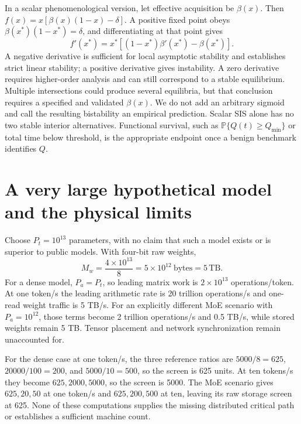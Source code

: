 \documentclass[11pt]{article}
\newcommand{\Prb}{\mathbb P}
\begin{document}
In a scalar phenomenological version, let effective acquisition be $\beta(x)$. Then $f(x)=x[\beta(x)(1-x)-\delta]$. A positive fixed point obeys $\beta(x^*)(1-x^*)=\delta$, and differentiating at that point gives
\begin{equation}
f'(x^*)=x^*[(1-x^*)\beta'(x^*)-\beta(x^*)].
\end{equation}
A negative derivative is sufficient for local asymptotic stability and establishes strict linear stability; a positive derivative gives instability. A zero derivative requires higher-order analysis and can still correspond to a stable equilibrium. Multiple intersections could produce several equilibria, but that conclusion requires a specified and validated $\beta(x)$. We do not add an arbitrary sigmoid and call the resulting bistability an empirical prediction. Scalar SIS alone has no two stable interior alternatives. Functional survival, such as $\Prb\{Q(t)\ge Q_{\min}\}$ or total time below threshold, is the appropriate endpoint once a benign benchmark identifies $Q$.

\section{A very large hypothetical model and the physical limits}
Choose $P_t=10^{13}$ parameters, with no claim that such a model exists or is superior to public models. With four-bit raw weights,
\begin{equation}
M_w=\frac{4\times10^{13}}8=5\times10^{12}\ \mathrm{bytes}=5\,\mathrm{TB}.
\end{equation}
For a dense model, $P_a=P_t$, so leading matrix work is $2\times10^{13}$ operations/token. At one token/s the leading arithmetic rate is 20 trillion operations/s and one-read weight traffic is 5 TB/s. For an explicitly different MoE scenario with $P_a=10^{12}$, those terms become 2 trillion operations/s and 0.5 TB/s, while stored weights remain 5 TB. Tensor placement and network synchronization remain unaccounted for.

For the dense case at one token/s, the three reference ratios are $5000/8=625$, $20000/100=200$, and $5000/10=500$, so the screen is 625 units. At ten tokens/s they become $625,2000,5000$, so the screen is 5000. The MoE scenario gives $625,20,50$ at one token/s and $625,200,500$ at ten, leaving its raw storage screen at 625. None of these computations supplies the missing distributed critical path or establishes a sufficient machine count.
\end{document}
